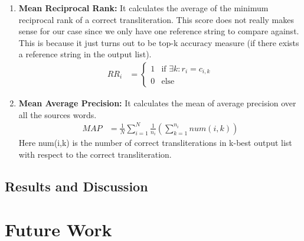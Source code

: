 \documentclass[11pt,a4paper]{article}
\begin{document}
\begin{enumerate}
\item \textbf{Mean Reciprocal Rank: } It calculates the average of the minimum reciprocal rank of a correct transliteration. This score does not really makes sense for our case since we only have one reference string to compare against. This is because it just turns out to be top-k accuracy measure (if there exists a reference string in the output list).
\begin{align*}
	RR_i & = 
		\begin{cases}
			1 & \text{if }\exists k: r_i = c_{i,k} \\
			0 & \text{else}
		\end{cases}
\end{align*}
\item \textbf{Mean Average Precision: } It calculates the mean of average precision over  all the sources words.
\begin{align*}
	MAP & = \frac{1}{N} \sum_{i=1}^{N} \frac{1}{n_i} (\sum_{k=1}^{n_i}num(i,k))
\end{align*}
Here num(i,k) is the number of correct transliterations in k-best output list with respect to the correct transliteration.

\end{enumerate}
\subsection{Results and Discussion}

\section{Future Work}


\end{document}
